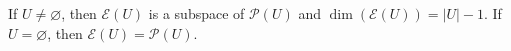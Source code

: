 If $U \neq \varnothing$, then $\mathcal{E}(U)$ is a subspace of $\mathcal{P}(U)$ and $\dim(\mathcal{E}(U)) = |U| - 1$. If $U = \varnothing$, then $\mathcal{E}(U) = \mathcal{P}(U)$.
